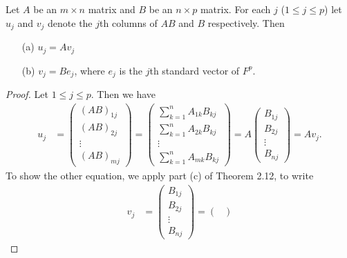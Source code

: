 \begin{theorem}\label{Theorem 2.13} %
   Let \( A  \) be an \( m \times n  \) matrix and \( B  \) be an \( n \times p  \) matrix. For each \( j  \) (\( 1 \leq j \leq p  \)) let \( {u}_{j}  \) and \(  {v}_{j}  \) denote the \( j \)th columns of \( AB  \) and \( B  \) respectively. Then
    \begin{enumerate}
        \item[(a)]  \( {u}_{j} = A {v}_{j}  \)
        \item[(b)] \( {v}_{j} = B {e}_{j }  \), where \( {e}_{j}  \) is the \( j \)th standard vector of \( F^{p} \).
    \end{enumerate}
\end{theorem}

\begin{proof}
Let \( 1 \leq j \leq p  \). Then we have
\begin{align*}
    {u}_{j} &= \begin{pmatrix}
        {(AB)}_{1j } \\
        {(AB)}_{2j } \\
        \vdots \\
        {(AB)}_{mj} 
    \end{pmatrix} = \begin{pmatrix}
        \sum_{ k=1 }^{ n } {A}_{1k} {B}_{kj} \\
        \sum_{ k=1  }^{  n } {A}_{2k } {B}_{kj } \\
        \vdots \\
        \sum_{ k=1 }^{ n } {A}_{mk } {B}_{kj }
    \end{pmatrix} =  A \begin{pmatrix}
        {B}_{1j } \\
        {B}_{2j } \\
        \vdots \\
        {B}_{nj}
    \end{pmatrix} =  A {v}_{j }.
\end{align*}
To show the other equation, we apply part (c) of Theorem 2.12, to write
\begin{align*}
   {v}_{j}  &= \begin{pmatrix}
       {B}_{1j } \\
       {B}_{2j } \\
       \vdots \\
       {B}_{nj } 
   \end{pmatrix} = 
   \begin{pmatrix}

\end{pmatrix}
\end{align*}
\end{proof}
